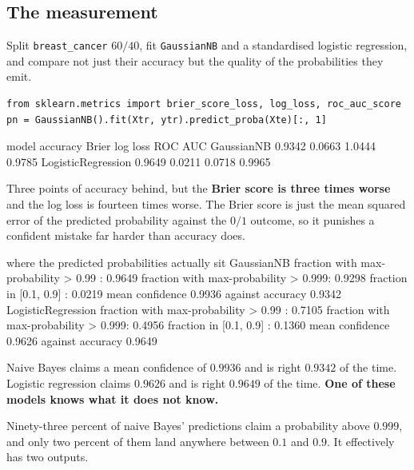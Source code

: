 \documentclass[11pt]{article}
\begin{document}
\subsection{The measurement}

Split \texttt{breast\_cancer} $60/40$, fit \texttt{GaussianNB} and a
standardised logistic regression, and compare not just their accuracy but the
quality of the probabilities they emit.

\begin{lstlisting}
from sklearn.metrics import brier_score_loss, log_loss, roc_auc_score
pn = GaussianNB().fit(Xtr, ytr).predict_proba(Xte)[:, 1]
\end{lstlisting}
\begin{codeout}
model                 accuracy     Brier   log loss   ROC AUC
GaussianNB              0.9342    0.0663     1.0444    0.9785
LogisticRegression      0.9649    0.0211     0.0718    0.9965
\end{codeout}

Three points of accuracy behind, but the \textbf{Brier score is three times
worse} and the log loss is fourteen times worse. The Brier score is just the
mean squared error of the predicted probability against the $0/1$ outcome, so
it punishes a confident mistake far harder than accuracy does.

\begin{codeout}
where the predicted probabilities actually sit
   GaussianNB           fraction with max-probability > 0.99 : 0.9649
                        fraction with max-probability > 0.999: 0.9298
                        fraction in [0.1, 0.9]              : 0.0219
                        mean confidence 0.9936 against accuracy 0.9342
   LogisticRegression   fraction with max-probability > 0.99 : 0.7105
                        fraction with max-probability > 0.999: 0.4956
                        fraction in [0.1, 0.9]              : 0.1360
                        mean confidence 0.9626 against accuracy 0.9649
\end{codeout}

\begin{keyidea}
Naive Bayes claims a mean confidence of $\mathbf{0.9936}$ and is right
$\mathbf{0.9342}$ of the time. Logistic regression claims $0.9626$ and is
right $0.9649$ of the time. \textbf{One of these models knows what it does
not know.}
\end{keyidea}

Ninety-three percent of naive Bayes' predictions claim a probability above
$0.999$, and only two percent of them land anywhere between $0.1$ and $0.9$.
It effectively has two outputs.
\end{document}
